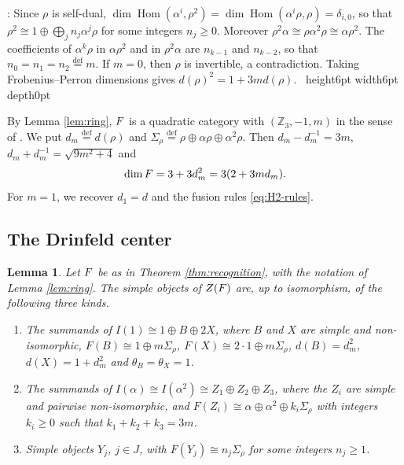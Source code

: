 \documentclass[leqno]{article}
\let\cal\relax
\newcommand{\cal}{\mathcal}
\newcommand{\Z}{\ensuremath{\mathbb{Z}}}
\renewcommand{\geq}{\ensuremath{\geqslant}}
\newcommand{\qed}{\hfill \vrule height6pt  width6pt depth0pt}
\newcommand{\ov}{\overset}
\newtheorem{lemma}[thm]{Lemma}
\newenvironment{proof}[1][]{\noindent {\it Proof #1} : }{\hbox{~}\qed
\smallskip
}
\numberwithin{equation}{section}
\begin{document}
\begin{proof}
Since $\rho$ is self-dual, $\dim\operatorname{Hom}(\alpha^i,\rho^2) = \dim\operatorname{Hom}(\alpha^i\rho,\rho) = \delta_{i,0}$, so that $\rho^2 \cong 1 \oplus \bigoplus_j n_j\alpha^j\rho$ for some integers $n_j \geq 0$. Moreover $\rho^2\alpha \cong \rho\alpha^2\rho \cong \alpha\rho^2$. The coefficients of $\alpha^k\rho$ in $\alpha\rho^2$ and in $\rho^2\alpha$ are $n_{k-1}$ and $n_{k-2}$, so that $n_0 = n_1 = n_2 \ov{\mathrm{def}}{=} m$. If $m = 0$, then $\rho$ is invertible, a contradiction. Taking Frobenius--Perron dimensions gives $d(\rho)^2 = 1+3m d(\rho)$.
\end{proof}

By Lemma \ref{lem:ring}, $\cal F$ is a quadratic category with $(\Z_3,-1,m)$ in the sense of \cite[Definition 2.1 p.~6]{Izu18}. We put $d_m \ov{\mathrm{def}}{=} d(\rho)$ and $\Sigma_\rho \ov{\mathrm{def}}{=} \rho \oplus \alpha\rho \oplus \alpha^2\rho$. Then $d_m - d_m^{-1} = 3m$, $d_m+d_m^{-1} = \sqrt{9m^2+4}$ and
\begin{equation}
\label{eq:dim-F-m}
\dim \cal F = 3+3d_m^2 = 3(2+3m d_m).
\end{equation}
For $m = 1$, we recover $d_1 = d$ and the fusion rules \eqref{eq:H2-rules}.

\subsection{The Drinfeld center}
\label{subsec:recognition-center}

\begin{lemma}
\label{lem:recognition-center}
Let $\cal F$ be as in Theorem \ref{thm:recognition}, with the notation of Lemma \ref{lem:ring}. The simple objects of $Z(\cal F)$ are, up to isomorphism, of the following three kinds.
\begin{enumerate}
\item The summands of $I(1) \cong 1 \oplus B \oplus 2X$, where $B$ and $X$ are simple and non-isomorphic, $F(B) \cong 1 \oplus m\Sigma_\rho$, $F(X) \cong 2\cdot 1 \oplus m\Sigma_\rho$, $d(B) = d_m^2$, $d(X) = 1+d_m^2$ and $\theta_B = \theta_X = 1$.
\item The summands of $I(\alpha) \cong I(\alpha^2) \cong Z_1 \oplus Z_2 \oplus Z_3$, where the $Z_i$ are simple and pairwise non-isomorphic, and $F(Z_i) \cong \alpha \oplus \alpha^2 \oplus k_i\Sigma_\rho$ with integers $k_i \geq 0$ such that $k_1+k_2+k_3 = 3m$.
\item Simple objects $Y_j$, $j \in J$, with $F(Y_j) \cong n_j\Sigma_\rho$ for some integers $n_j \geq 1$.
\end{enumerate}
\end{lemma}
\end{document}
